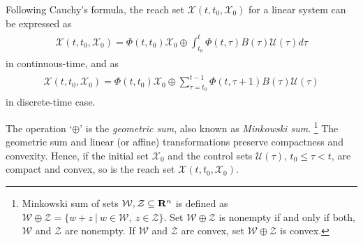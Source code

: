 \documentclass[letterpaper,10pt,english]{sphinxmanual}
\begin{document}
Following Cauchy’s formula, the reach set
${\mathcal X}(t, t_0, {\mathcal X}_0)$ for a linear system can be
expressed as
\label{main_source:equation-ctlsrs}\begin{gather}
\begin{split}{\mathcal X}(t, t_0, {\mathcal X}_0) =
\Phi(t, t_0){\mathcal X}_0 \oplus \int_{t_0}^t\Phi(t, \tau)B(\tau){\mathcal U}(\tau)d\tau\end{split}\label{main_source-ctlsrs}
\end{gather}
in continuous-time, and as
\label{main_source:equation-dtlsrs}\begin{gather}
\begin{split}{\mathcal X}(t, t_0, {\mathcal X}_0) =
\Phi(t, t_0){\mathcal X}_0 \oplus \sum_{\tau=t_0}^{t-1}\Phi(t, \tau+1)B(\tau){\mathcal U}(\tau)\end{split}\label{main_source-dtlsrs}
\end{gather}
in discrete-time case.

The operation ‘$\oplus$’ is the \emph{geometric sum}, also known as
\emph{Minkowski sum}. \footnote{
Minkowski sum of sets
${\mathcal W}, {\mathcal Z}\subseteq {\bf R}^n$ is defined as
${\mathcal W}\oplus {\mathcal Z}= \{w+z ~|~ w\in{\mathcal W}, ~ z\in{\mathcal Z}\}$.
Set ${\mathcal W}\oplus{\mathcal Z}$ is nonempty if and only if
both, ${\mathcal W}$ and ${\mathcal Z}$ are nonempty. If
${\mathcal W}$ and ${\mathcal Z}$ are convex, set
${\mathcal W}\oplus{\mathcal Z}$ is convex.
} The geometric sum and linear (or affine)
transformations preserve compactness and convexity. Hence, if the
initial set ${\mathcal X}_0$ and the control sets
${\mathcal U}(\tau)$, $t_0\leqslant\tau<t$, are compact and
convex, so is the reach set
${\mathcal X}(t, t_0, {\mathcal X}_0)$.
\end{document}
